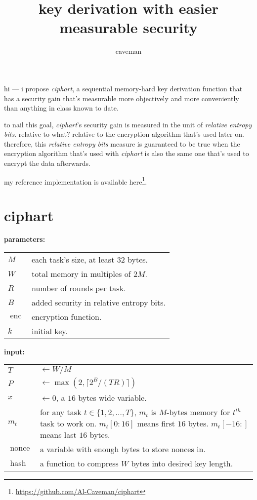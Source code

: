\documentclass{article}
\author{caveman}
\title{key derivation with easier measurable security}
\DeclareMathOperator{\enc}{enc}
\DeclareMathOperator{\maxf}{max}
\DeclareMathOperator{\nonce}{nonce}
\DeclareMathOperator{\hash}{hash}
\begin{document}
\begin{multicols}{2}
\maketitle

hi --- i propose \emph{ciphart}, a sequential memory-hard key derivation
function that has a security gain that's measurable more objectively and
more conveniently than anything in class known to date.

to nail this goal, \emph{ciphart}'s security gain is measured in the unit
of \emph{relative entropy bits}.  relative to what?  relative to the
encryption algorithm that's used later on.  therefore, this \emph{relative
entropy bits} measure is guaranteed to be true when the encryption
algorithm that's used with \emph{ciphart} is also the same one that's used
to encrypt the data afterwards.

my reference implementation is available
here\footnote{\url{https://github.com/Al-Caveman/ciphart}}.

\tableofcontents
\vfill\null
\columnbreak

\section{ciphart}
\noindent\textbf{parameters:}

\begin{tabular}{lp{18em}}
    $M$   & each task's size, at least $32$ bytes.\\
    $W$   & total memory in multiples of $2M$.\\
    $R$ & number of rounds per task.\\
    $B$ & added security in relative entropy bits.\\
    $\enc$ & encryption function.\\
    $k$ & initial key.\\
\end{tabular}

\noindent\textbf{input:}

\begin{tabular}{lp{18em}}
    $T$ & $\leftarrow W/M$\\
    $P$ & $\leftarrow \maxf(2, \lceil2^B / (TR)\rceil)$\\
    $x$ & $\leftarrow 0$, a $16$ bytes wide variable.\\
    $m_t$ & for any task $t \in \{1,2,\ldots,T\}$, $m_t$ is $M$-bytes memory
    for $t^{th}$ task to work on.  $m_t[0:16]$ means first $16$ bytes.
    $m_t[-16:]$ means last $16$ bytes.\\
    $\nonce$ & a variable with enough bytes to store nonces in.\\
    $\hash$ & a function to compress $W$ bytes into desired key length.\\
\end{tabular}


\end{multicols}
\end{document}
